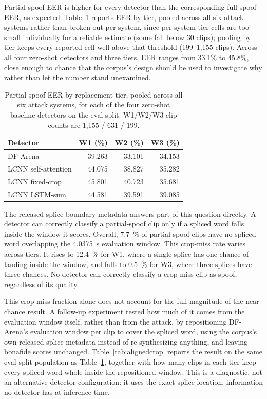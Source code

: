 \documentclass[11pt]{report}
\begin{document}
Partial-spoof EER is higher for every detector than the corresponding
full-spoof EER, as expected. Table~\ref{tab:partialspoofeer} reports
EER by tier, pooled across all six attack systems rather than broken
out per system, since per-system tier cells are too small individually
for a reliable estimate (some fall below 30 clips); pooling by tier
keeps every reported cell well above that threshold
(199--1{,}155 clips). Across all four zero-shot detectors and three tiers, EER
ranges from 33.1\% to 45.8\%, close enough to chance that the corpus's
design should be used to investigate why rather than let the number
stand unexamined.

\begin{table}[H]
\centering
\caption{Partial-spoof EER by replacement tier, pooled across all six
attack systems, for each of the four zero-shot baseline detectors on
the eval split. W1/W2/W3 clip counts are 1{,}155 / 631 / 199.}
\label{tab:partialspoofeer}
\small
\begin{tabular}{lrrr}
\toprule
\textbf{Detector} & \textbf{W1 (\%)} & \textbf{W2 (\%)} & \textbf{W3 (\%)} \\
\midrule
DF-Arena             & 39.263 & 33.101 & 34.153 \\
LCNN self-attention  & 44.075 & 38.827 & 35.282 \\
LCNN fixed-crop      & 45.801 & 40.723 & 35.681 \\
LCNN LSTM-sum        & 44.581 & 39.591 & 39.085 \\
\bottomrule
\end{tabular}
\end{table}

The released splice-boundary metadata answers part of this
question directly. A detector can correctly classify a partial-spoof clip
only if a spliced word falls inside the window it scores. Overall,
\SI{7.7}{\percent} of partial-spoof clips have no spliced word
overlapping the \SI{4.0375}{\second} evaluation window. This crop-miss
rate varies across tiers. It rises to \SI{12.4}{\percent} for W1, where a
single splice has one chance of landing inside the window, and falls to
\SI{0.5}{\percent} for W3, where three splices have three chances. No
detector can correctly classify a crop-miss clip as spoof, regardless of
its quality.

This crop-miss fraction alone does not account for the full magnitude
of the near-chance result. A follow-up experiment tested how much of
it comes from the evaluation window itself, rather than from the
attack, by repositioning DF-Arena's evaluation window per clip to
cover the spliced word, using the corpus's own released splice
metadata instead of re-synthesizing anything, and leaving bonafide
scores unchanged. Table~\ref{tab:alignedcrop} reports the result on
the same eval-split population as Table~\ref{tab:partialspoofeer},
together with how many clips in each tier keep every spliced word
whole inside the repositioned window. This is a diagnostic, not an
alternative detector configuration: it uses the exact splice location,
information no detector has at inference time.
\end{document}
